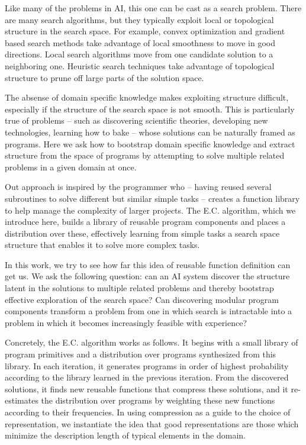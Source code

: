 \documentclass{article}
\begin{document}
Like many of the problems in AI, this one can be cast as a search
problem. There are many search algorithms, but they typically exploit
local or topological structure in the search space. For example,
convex optimization and gradient based search methods take
advantage of local smoothness to move in good directions. Local search
algorithms move from one candidate solution to a neighboring
one. Heuristic search techniques take advantage of topological
structure to prune off large parts of the solution space.

The absense of domain specific knowledge makes exploiting structure
difficult, especially if the structure of the search space is not
smooth. This is particularly true of problems -- such as discovering
scientific theories, developing new technologies, learning how to bake
-- whose solutions can be naturally framed as programs. Here we ask
how to bootstrap domain specific knowledge and extract structure from
the space of programs by attempting to solve multiple related problems
in a given domain at once.

Out approach is inspired by the programmer who -- having reused
several subroutines to solve different but similar simple tasks --
creates a function library to help manage the complexity of larger
projects. The E.C. algorithm, which we introduce here, builds a library
of reusable program components and places a distribution over these,
effectively learning from simple tasks a search space structure that
enables it to solve more complex tasks.

In this work, we try to see how far this idea of reusable function
definition can get us. We ask the following question: can an AI system
discover the structure latent in the solutions to multiple related
problems and thereby bootstrap effective exploration of the search
space? Can discovering modular program components transform a problem
from one in which search is intractable into a problem in which it
becomes increasingly feasible with experience?

Concretely, the E.C. algorithm works as follows. It begins with a small
library of program primitives and a distribution over programs
synthesized from this library. In each iteration, it generates
programs in order of highest probability according to the library
learned in the previous iteration. From the discovered solutions, it
finds new reusable functions that compress these solutions, and it
re-estimates the distribution over programs by weighting these new
functions according to their frequencies. In using compression as a
guide to the choice of representation, we instantiate the idea that
good representations are those which minimize the description length
of typical elements in the domain.
\end{document}
